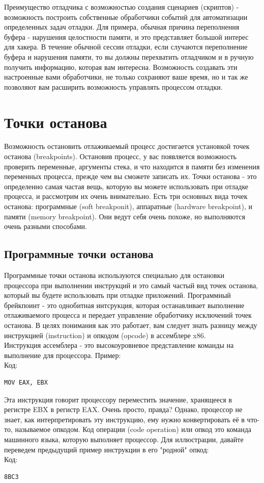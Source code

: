 \documentclass[12pt, a4paper, oneside]{book}
\begin{document}
Преимущество отладчика с возможностью создания сценариев (скриптов) - возможность построить собственные обработчики событий для автоматизации определенных задач отладки. Для примера, обычная причина переполнения буфера - нарушения целостности памяти, и это представляет большой интерес для хакера. В течение обычной сессии отладки, если случаются переполнение буфера и нарушения памяти, то вы должны перехватить отладчиком и в ручную получить информацию, которая вам интересна. Возможность создавать эти настроенные вами обработчики, не только сохраняют ваше время, но и так же позволяют вам расширить возможность управлять процессом отладки.\\


\section{Точки останова}

Возможность остановить отлаживаемый процесс достигается установкой точек останова (breakpoints). Остановив процесс, у вас появляется возможность проверить переменные, аргументы стека, и что находится в памяти без изменения переменных процесса, прежде чем вы сможете записать их. Точки останова - это определенно самая частая вещь, которую вы можете использовать при отладке процесса, и рассмотрим их очень внимательно. Есть три основных вида точек останова: программные (soft breakponit), аппаратные (hardware breakpoint), и памяти (memory breakpoint). Они ведут себя очень похоже, но выполняются очень разными способами.\\

\subsection{Программные точки останова}

Программные точки останова используются специально для остановки процессора при выполнении инструкций и это самый частый вид точек останова, который вы будете использовать при отладке приложений. Программный брейкпоинт - это однобитная интсрукция, которая останавливает выполнение отлаживаемого процесса и передает управление обработчику исключений точек останова. В целях понимания как это работает, вам следует знать разницу между инструкцией (instruction) и опкодом (opcode) в ассемблере x86.\\

Инструкция ассемблера - это высокоуровневое представление команды на выполнение для процессора. Пример:\\
Код:
\begin{verbatim}
MOV EAX, EBX
\end{verbatim}
Эта инструкция говорит процессору переместить значение, хранящееся в регистре EBX в регистр EAX. Очень просто, правда? Однако, процессор не знает, как интерпретировать эту инструкцию, ему нужно конвертировать её в что-то, называемое опкодом. Код операции (code operation) или опкод это команда машинного языка, которую выполняет процессор. Для иллюстрации, давайте переведем предыдущий пример инструкции в его "родной" опкод:\\
Код:
\begin{verbatim}
8BC3
\end{verbatim}
\end{document}
